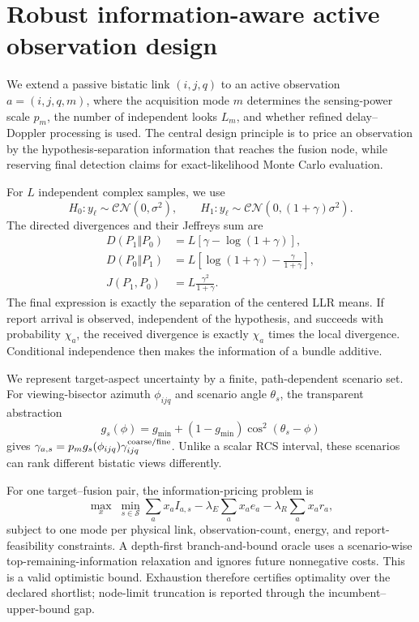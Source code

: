 \section{Robust information-aware active observation design}
\label{sec:active-information-v15}

We extend a passive bistatic link $(i,j,q)$ to an active observation
$a=(i,j,q,m)$, where the acquisition mode $m$ determines the sensing-power
scale $p_m$, the number of independent looks $L_m$, and whether refined
delay--Doppler processing is used.  The central design principle is to price
an observation by the hypothesis-separation information that reaches the
fusion node, while reserving final detection claims for exact-likelihood
Monte Carlo evaluation.

For $L$ independent complex samples, we use
\begin{equation}
 H_0:y_\ell\sim\mathcal{CN}(0,\sigma^2),\qquad
 H_1:y_\ell\sim\mathcal{CN}(0,(1+\gamma)\sigma^2).
\end{equation}
The directed divergences and their Jeffreys sum are
\begin{align}
 D(P_1\Vert P_0)&=L\left[\gamma-\log(1+\gamma)\right],\\
 D(P_0\Vert P_1)&=L\left[\log(1+\gamma)-\frac{\gamma}{1+\gamma}\right],\\
 J(P_1,P_0)&=L\frac{\gamma^2}{1+\gamma}.
\end{align}
The final expression is exactly the separation of the centered LLR means.
If report arrival is observed, independent of the hypothesis, and succeeds
with probability $\chi_a$, the received divergence is exactly $\chi_a$ times
the local divergence.  Conditional independence then makes the information
of a bundle additive.

We represent target-aspect uncertainty by a finite, path-dependent scenario
set.  For viewing-bisector azimuth $\phi_{ijq}$ and scenario angle $\theta_s$,
the transparent abstraction
\begin{equation}
 g_s(\phi)=g_{\min}+(1-g_{\min})\cos^2(\theta_s-\phi)
\end{equation}
gives $\gamma_{a,s}=p_m g_s(\phi_{ijq})\gamma_{ijq}^{\rm coarse/fine}$.
Unlike a scalar RCS interval, these scenarios can rank different bistatic
views differently.

For one target--fusion pair, the information-pricing problem is
\begin{equation}
 \max_x\;\min_{s\in\mathcal S}\sum_a x_a I_{a,s}
 -\lambda_E\sum_a x_a e_a-\lambda_R\sum_a x_a r_a,
\end{equation}
subject to one mode per physical link, observation-count, energy, and
report-feasibility constraints.  A depth-first branch-and-bound oracle uses a
scenario-wise top-remaining-information relaxation and ignores future
nonnegative costs.  This is a valid optimistic bound.  Exhaustion therefore
certifies optimality over the declared shortlist; node-limit truncation is
reported through the incumbent--upper-bound gap.


